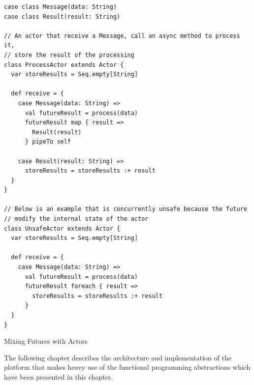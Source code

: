 \begin{listing}[h]
\begin{verbatim}
case class Message(data: String)
case class Result(result: String)

// An actor that receive a Message, call an async method to process it,
// store the result of the processing
class ProcessActor extends Actor {
  var storeResults = Seq.empty[String]

  def receive = {
    case Message(data: String) => 
      val futureResult = process(data)
      futureResult map { result =>
        Result(result)
      } pipeTo self

    case Result(result: String) =>
      storeResults = storeResults :+ result
  }
}

// Below is an example that is concurrently unsafe because the future 
// modify the internal state of the actor
class UnsafeActor extends Actor {
  var storeResults = Seq.empty[String]

  def receive = {
    case Message(data: String) => 
      val futureResult = process(data)
      futureResult foreach { result =>
        storeResults = storeResults :+ result
      }
  }
}
\end{verbatim}
\caption{Mixing Futures with Actors}
\label{lst:akkasafeunsafe}
\end{listing}

The following chapter describes the architecture and implementation of the platform that makes heavy use of the functional programming abstractions which have been 
presented in this chapter.


